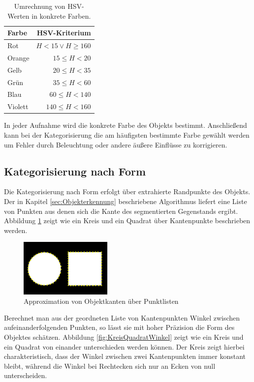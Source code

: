 \begin{table}
	\centering
	\begin{tabular}{lr}
		\toprule
		Farbe & HSV-Kriterium\\
		\midrule
		Rot & $H < 15\vee H \geq 160$ \\
		Orange & $15 \leq H < 20$ \\
		Gelb & $20 \leq H < 35$ \\
		Grün & $35 \leq H < 60$ \\
		Blau & $60 \leq H < 140$ \\
		Violett & $140 \leq H < 160$ \\
												
		\bottomrule
	\end{tabular}
	\caption{Umrechnung von HSV-Werten in konkrete Farben.}
	\label{tab:Farbtabelle}
\end{table}

In jeder Aufnahme wird die konkrete Farbe des Objekts bestimmt. Anschließend kann bei der Kategorisierung die am häufigsten bestimmte Farbe gewählt werden um Fehler durch Beleuchtung oder andere äußere Einflüsse zu korrigieren.

\subsection{Kategorisierung nach Form}

Die Kategorisierung nach Form erfolgt über extrahierte Randpunkte des Objekts. Der in Kapitel \ref{sec:Objekterkennung} beschriebene Algorithmus liefert eine Liste von Punkten aus denen sich die Kante des segmentierten Gegenstands ergibt. Abbildung \ref{fig:KreisQuadrat} zeigt wie ein Kreis und ein Quadrat über Kantenpunkte beschrieben werden.

\begin{figure}[h]
\centering
\includegraphics[width=0.4\textwidth]{Bilder/Workloop/KreisQuadrat}
\caption{Approximation von Objektkanten über Punktlisten}
\label{fig:KreisQuadrat}
\end{figure}

Berechnet man aus der geordneten Liste von Kantenpunkten Winkel zwischen aufeinanderfolgenden Punkten, so lässt sie mit hoher Präzision die Form des Objektes schätzen. Abbildung \ref{fig:KreisQuadratWinkel} zeigt wie ein Kreis und ein Quadrat von einander unterschieden werden können. Der Kreis zeigt hierbei charakteristisch, dass der Winkel zwischen zwei Kantenpunkten immer konstant bleibt, während die Winkel bei Rechtecken sich nur an Ecken von null unterscheiden.


